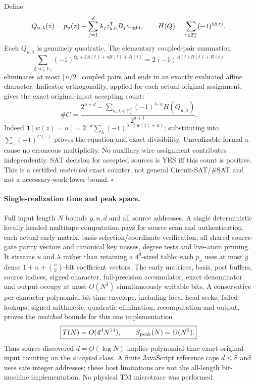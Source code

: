 \documentclass[11pt]{article}
\begin{document}
Define
\[
Q_{u,\lambda}(z)=p_u(z)+
 \sum_{j=1}^d\lambda_jz_{\rm left}^{\mathsf T}B_jz_{\rm right},
\qquad
H(Q)=\sum_{z\in\mathbb F_2^n}(-1)^{Q(z)}.
\]
Each $Q_{u,\lambda}$ is genuinely quadratic. The elementary
coupled-pair summation
\[
\sum_{\xi,\eta\in\mathbb F_2}
 (-1)^{\xi\eta+\xi A(t)+\eta B(t)+R(t)}
 =2(-1)^{A(t)B(t)+R(t)}
\]
eliminates at most $\lfloor n/2\rfloor$ coupled pairs and ends
in an exactly evaluated affine character. Indicator orthogonality,
applied for each actual original assignment, gives the exact
original-input accepting count:
\[
\boxed{\#C=
\frac{2^{n+d}-
\displaystyle\sum_{u,\lambda\in\mathbb F_2^d}
(-1)^{\lambda\cdot u}H(Q_{u,\lambda})}
{2^{d+1}}.}
\]
Indeed $\mathbf1[w(z)=u]=2^{-d}\sum_\lambda
(-1)^{\lambda\cdot(w(z)+u)}$; substituting into
$\sum_z(-1)^{C(z)}$ proves the equation and exact divisibility.
Unrealizable formal $u$ cause no erroneous multiplicity.
No auxiliary-wire assignment contributes independently.
SAT decision for accepted sources is YES iff this count is positive.
This is a certified \emph{restricted} exact counter, not general
Circuit-SAT/\#SAT and not a necessary-work lower bound.
\hfill$\square$

\paragraph{Single-realization time and peak space.}
Full input length $N$ bounds $g,n,d$ and all source addresses.
A single deterministic locally headed multitape computation pays for
source scan and authentication, each actual early matrix,
basis selection/coordinate verification, all shared source-gate
parity vectors and canonical key misses, degree tests and live-atom
pruning. It streams $u$ and $\lambda$ rather than retaining a
$4^d$-sized table; each $p_u$ uses at most $g$ dense
$1+n+\binom n2$-bit coefficient vectors. The early matrices,
basis, post buffers, source indices, signed character, full-precision
accumulator, exact denominator and output occupy at most
$O(N^3)$ simultaneously writable bits. A conservative
per-character polynomial bit-time envelope, including local
head seeks, failed lookups, signed arithmetic, quadratic
elimination, recomputation and output, proves the \emph{matched}
bounds for this one implementation
\[
\boxed{T(N)=O(4^dN^{14}),\qquad S_{\rm peak}(N)=O(N^3).}
\]
Thus source-discovered $d=O(\log N)$ implies polynomial-time
exact original-input counting on the \emph{accepted} class.
A finite JavaScript reference caps $d\le8$ and uses safe integer
addresses; these host limitations are not the all-length bit-machine
implementation. No physical TM microtrace was performed.
\end{document}
